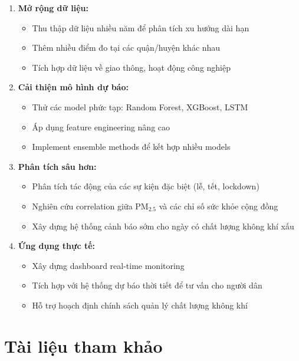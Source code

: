 \documentclass[12pt,a4paper]{article}
\newcommand{\pmtwofive}{PM$_{2.5}$}
\begin{document}
\begin{enumerate}
    \item \textbf{Mở rộng dữ liệu:}
    \begin{itemize}
        \item Thu thập dữ liệu nhiều năm để phân tích xu hướng dài hạn
        \item Thêm nhiều điểm đo tại các quận/huyện khác nhau
        \item Tích hợp dữ liệu về giao thông, hoạt động công nghiệp
    \end{itemize}
    
    \item \textbf{Cải thiện mô hình dự báo:}
    \begin{itemize}
        \item Thử các model phức tạp: Random Forest, XGBoost, LSTM
        \item Áp dụng feature engineering nâng cao
        \item Implement ensemble methods để kết hợp nhiều models
    \end{itemize}
    
    \item \textbf{Phân tích sâu hơn:}
    \begin{itemize}
        \item Phân tích tác động của các sự kiện đặc biệt (lễ, tết, lockdown)
        \item Nghiên cứu correlation giữa \pmtwofive{} và các chỉ số sức khỏe cộng đồng
        \item Xây dựng hệ thống cảnh báo sớm cho ngày có chất lượng không khí xấu
    \end{itemize}
    
    \item \textbf{Ứng dụng thực tế:}
    \begin{itemize}
        \item Xây dựng dashboard real-time monitoring
        \item Tích hợp với hệ thống dự báo thời tiết để tư vấn cho người dân
        \item Hỗ trợ hoạch định chính sách quản lý chất lượng không khí
    \end{itemize}
\end{enumerate}

\section{Tài liệu tham khảo}
\end{document}
